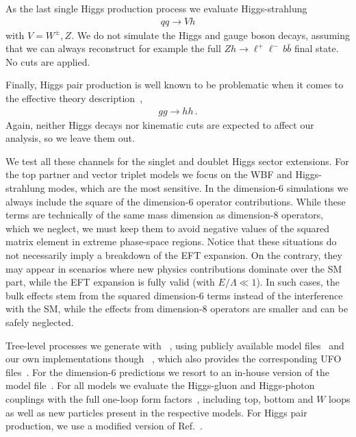 As the last single Higgs production process we evaluate
Higgs-strahlung
%
\begin{align} q q \to V h
\end{align}
%
with $V = W^\pm, Z$. We do not simulate the Higgs and gauge boson
decays, assuming that we can always reconstruct for example the full
$Zh \to \ell^+ \ell^- \, b \bar{b}$ final state. No cuts are
applied.\medskip

Finally, Higgs pair production is well known to be problematic when it
comes to the effective theory description~\cite{hh-breakdown},
%
\begin{align} g g \to h h \,.
\end{align}
%
Again, neither Higgs decays nor kinematic cuts are expected to affect
our analysis, so we leave them out.

We test all these channels for the singlet and doublet Higgs sector
extensions. For the top partner and vector triplet models we focus on
the WBF and Higgs-strahlung modes, which are the most sensitive.  In
the dimension-6 simulations we always include the square of the
dimension-6 operator contributions. While these terms are technically
of the same mass dimension as dimension-8 operators, which we neglect,
we must keep them to avoid negative values of the squared matrix
element in extreme phase-space regions. Notice that these situations
do not necessarily imply a breakdown of the EFT expansion. On the
contrary, they may appear in scenarios where new physics contributions
dominate over the SM part, while the EFT expansion is fully valid
(with $E/\Lambda \ll 1$). In such cases, the bulk effects stem from
the squared dimension-6 terms instead of the interference with the SM,
while the effects from dimension-8 operators are smaller and can be
safely neglected.  \medskip

Tree-level processes we generate with
~\cite{Alwall:2014hca}, using publicly available
model files~\cite{feynrules-site} and our own implementations though
~\cite{Alloul:2013bka}, which also provides the
corresponding UFO files~\cite{Degrande:2011ua}.  For the dimension-6
predictions we resort to an in-house version of the 
model file~\cite{Alloul:2013naa}.  For all models we evaluate the
Higgs-gluon and Higgs-photon couplings with the full one-loop form
factors~\cite{ggh-analytical}, including top, bottom and $W$ loops as
well as new particles present in the respective models. For Higgs pair
production, we use a modified version of Ref.~\cite{higgspair-ucl}.

